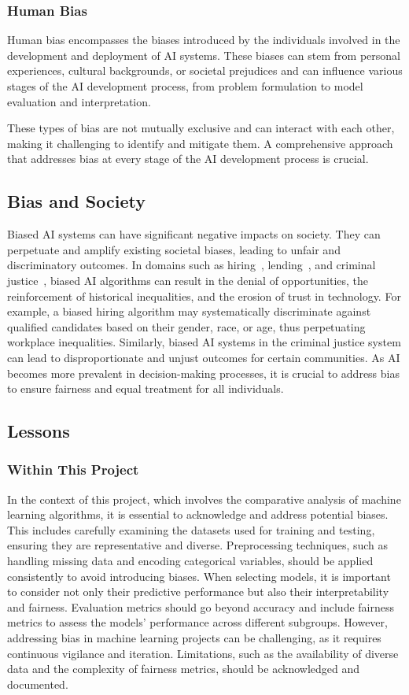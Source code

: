 \documentclass[letterpaper,10pt]{article}
\begin{document}
\subsubsection{Human Bias}
Human bias encompasses the biases introduced by the individuals involved in the development and deployment of AI systems. These biases can stem from personal experiences, cultural backgrounds, or societal prejudices and can influence various stages of the AI development process, from problem formulation to model evaluation and interpretation.

These types of bias are not mutually exclusive and can interact with each other, making it challenging to identify and mitigate them. A comprehensive approach that addresses bias at every stage of the AI development process is crucial.

\subsection{Bias and Society}
Biased AI systems can have significant negative impacts on society. They can perpetuate and amplify existing societal biases, leading to unfair and discriminatory outcomes. In domains such as hiring~\cite{amazon_hiring}, lending~\cite{credit_Score_bias}, and criminal justice~\cite{wrong_arrest_bias}, biased AI algorithms can result in the denial of opportunities, the reinforcement of historical inequalities, and the erosion of trust in technology. For example, a biased hiring algorithm may systematically discriminate against qualified candidates based on their gender, race, or age, thus perpetuating workplace inequalities. Similarly, biased AI systems in the criminal justice system can lead to disproportionate and unjust outcomes for certain communities. As AI becomes more prevalent in decision-making processes, it is crucial to address bias to ensure fairness and equal treatment for all individuals.

\subsection{Lessons}
\subsubsection{Within This Project}
In the context of this project, which involves the comparative analysis of machine learning algorithms, it is essential to acknowledge and address potential biases. This includes carefully examining the datasets used for training and testing, ensuring they are representative and diverse. Preprocessing techniques, such as handling missing data and encoding categorical variables, should be applied consistently to avoid introducing biases. When selecting models, it is important to consider not only their predictive performance but also their interpretability and fairness. Evaluation metrics should go beyond accuracy and include fairness metrics to assess the models' performance across different subgroups. However, addressing bias in machine learning projects can be challenging, as it requires continuous vigilance and iteration. Limitations, such as the availability of diverse data and the complexity of fairness metrics, should be acknowledged and documented. \par
\end{document}
